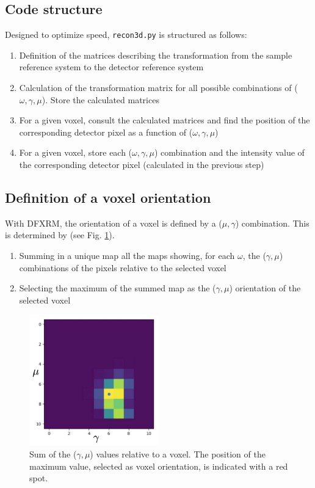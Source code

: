 \documentclass[11pt]{scrartcl}
\begin{document}
\subsection{Code structure}

Designed to optimize speed, {\texttt{recon3d.py}} is structured as follows: 
\begin{enumerate}
    \item Definition of the matrices describing the transformation from the sample reference system to the detector reference system
    \item Calculation of the transformation matrix for all possible combinations of ($\omega, \gamma, \mu$). Store the calculated matrices
    \item For a given voxel, consult the calculated matrices and find the position of the corresponding detector pixel as a function of ($\omega, \gamma, \mu$)
    \item For a given voxel, store each ($\omega, \gamma, \mu$) combination and the intensity value of the corresponding detector pixel (calculated in the previous step)
\end{enumerate}

\subsection{Definition of a voxel orientation}

With {\footnotesize{DFXRM}}, the orientation of a voxel is defined by a ($\mu, \gamma$) combination. This is determined by (see Fig. \ref{fig:mosaicity_map}).
\begin{enumerate}
    \item Summing in a unique map all the maps showing, for each $\omega$, the ($\gamma, \mu$) combinations of the pixels relative to the selected voxel
    \item Selecting the maximum of the summed map as the ($\gamma, \mu$) orientation of the selected voxel
\end{enumerate}

\begin{figure}[h]
    \centering
    \includegraphics[width=0.5\textwidth]{Mosaicity_map.png}
    \caption{Sum of the ($\gamma, \mu$) values relative to a voxel. The position of the maximum value, selected as voxel orientation, is indicated with a red spot.}
    \label{fig:mosaicity_map}
\end{figure}
\end{document}
